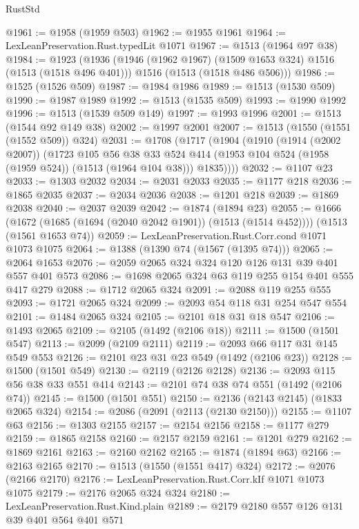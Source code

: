 \begin{lexlean}{RustStd}
\begin{coremodule}
@1961 := @1958 (@1959 @503)
@1962 := @1955 @1961
@1964 := LexLeanPreservation.Rust.typedLit @1071
@1967 := @1513 (@1964 @97 @38)
@1984 := @1923
    (@1936
      (@1946 (@1962 @1967) (@1509 @1653 @324) @1516 (@1513 (@1518 @496 @401)))
      @1516
      (@1513 (@1518 @486 @506)))
@1986 := @1525 (@1526 @509)
@1987 := @1984 @1986
@1989 := @1513 (@1530 @509)
@1990 := @1987 @1989
@1992 := @1513 (@1535 @509)
@1993 := @1990 @1992
@1996 := @1513 (@1539 @509 @149)
@1997 := @1993 @1996
@2001 := @1513 (@1544 @92 @149 @38)
@2002 := @1997 @2001
@2007 := @1513 (@1550 (@1551 (@1552 @509)) @324)
@2031 := @1708
    (@1717
      (@1904
        (@1910
          (@1914 (@2002 @2007))
          (@1723
            @105
            @56
            @38
            @33
            @524
            @414
            (@1953 @104 @524 (@1958 (@1959 @524)) (@1513 (@1964 @104 @38)))
            @1835))))
@2032 := @1107 @23
@2033 := @1303 @2032
@2034 := @2031 @2033
@2035 := @1177 @218
@2036 := @1865 @2035
@2037 := @2034 @2036
@2038 := @1201 @218
@2039 := @1869 @2038
@2040 := @2037 @2039
@2042 := @1874 (@1894 @23)
@2055 := @1666
    (@1672 (@1685 (@1694 (@2040 @2042 @1901)) (@1513 (@1514 @452))))
    (@1513 (@1561 @1653 @74))
@2059 := LexLeanPreservation.Rust.Corr.cond @1071 @1073 @1075
@2064 := @1388 (@1390 @74 (@1567 (@1395 @74)))
@2065 := @2064 @1653
@2076 := @2059 @2065 @324 @324 @120 @126 @131 @39 @401 @557 @401 @573
@2086 := @1698 @2065 @324 @63 @119 @255 @154 @401 @555 @417 @279
@2088 := @1712 @2065 @324
@2091 := @2088 @119 @255 @555
@2093 := @1721 @2065 @324
@2099 := @2093 @54 @118 @31 @254 @547 @554
@2101 := @1484 @2065 @324
@2105 := @2101 @18 @31 @18 @547
@2106 := @1493 @2065
@2109 := @2105 (@1492 (@2106 @18))
@2111 := @1500 (@1501 @547)
@2113 := @2099 (@2109 @2111)
@2119 := @2093 @66 @117 @31 @145 @549 @553
@2126 := @2101 @23 @31 @23 @549 (@1492 (@2106 @23))
@2128 := @1500 (@1501 @549)
@2130 := @2119 (@2126 @2128)
@2136 := @2093 @115 @56 @38 @33 @551 @414
@2143 := @2101 @74 @38 @74 @551 (@1492 (@2106 @74))
@2145 := @1500 (@1501 @551)
@2150 := @2136 (@2143 @2145) (@1833 @2065 @324)
@2154 := @2086 (@2091 (@2113 (@2130 @2150)))
@2155 := @1107 @63
@2156 := @1303 @2155
@2157 := @2154 @2156
@2158 := @1177 @279
@2159 := @1865 @2158
@2160 := @2157 @2159
@2161 := @1201 @279
@2162 := @1869 @2161
@2163 := @2160 @2162
@2165 := @1874 (@1894 @63)
@2166 := @2163 @2165
@2170 := @1513 (@1550 (@1551 @417) @324)
@2172 := @2076 (@2166 @2170)
@2176 := LexLeanPreservation.Rust.Corr.kIf @1071 @1073 @1075
@2179 := @2176 @2065 @324 @324
@2180 := LexLeanPreservation.Rust.Kind.plain
@2189 := @2179 @2180 @557 @126 @131 @39 @401 @564 @401 @571

\end{coremodule}
\end{lexlean}
